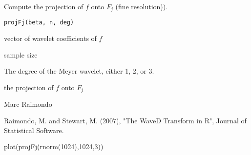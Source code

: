 \documentclass{article}
\begin{document}
\begin{Description}\relax
Compute the projection of $f$ onto $F_j$ (fine resolution)).
\end{Description}
\begin{Usage}
\begin{verbatim}
projFj(beta, n, deg)
\end{verbatim}
\end{Usage}
\begin{Arguments}
\begin{ldescription}
\item[\code{beta}] vector of wavelet coefficients of $f$
\item[\code{n}] sample size
\item[\code{deg}] The degree of the Meyer wavelet, either 1, 2, or 3.
\end{ldescription}
\end{Arguments}
\begin{Value}
the projection of $f$ onto $F_j$
\end{Value}
\begin{Author}\relax
Marc Raimondo
\end{Author}
\begin{References}\relax
Raimondo, M. and Stewart, M. (2007),
"The WaveD Transform in R", Journal of Statistical Software.
\end{References}
\begin{SeeAlso}\relax
{}
\end{SeeAlso}
\begin{Examples}
\begin{ExampleCode}
 plot(projFj(rnorm(1024),1024,3))
\end{ExampleCode}
\end{Examples}
\end{document}
